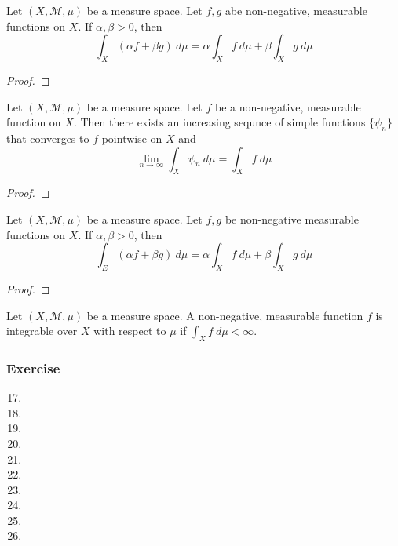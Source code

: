 \begin{theorem}
	Let $(X,\mathcal{M},\mu)$ be a measure space.
	Let $f,g$ abe non-negative, measurable functions on $X$.
	If $\alpha,\beta > 0$, then
	$$ \int_X (\alpha f + \beta g) \ d\mu = \alpha \int_X f \ d\mu + \beta\int_X g \ d\mu $$
\end{theorem}
\begin{proof}
\end{proof}

\begin{theorem}
	Let $(X,\mathcal{M},\mu)$ be a measure space.
	Let $f$ be a non-negative, measurable function on $X$.
	Then there exists an increasing sequnce of simple functions $\{ \psi_n \}$ that converges to $f$ pointwise on $X$ and
	$$ \lim_{n \to \infty} \int_X \psi_n \ d\mu = \int_X f \ d\mu $$
\end{theorem}
\begin{proof}
\end{proof}

\begin{theorem}
	Let $(X,\mathcal{M},\mu)$ be  a measure space.
	Let $f,g$ be non-negative measurable functions on $X$.
	If $\alpha,\beta > 0$, then
	$$ \int_E (\alpha f + \beta g) \ d\mu = \alpha \int_X f \ d\mu + \beta \int_X g \ d\mu $$
\end{theorem}
\begin{proof}
\end{proof}

\begin{definition}[integrable]
	Let $(X,\mathcal{M},\mu)$ be a measure space.
	A non-negative, measurable function $f$ is integrable over $X$ with respect to $\mu$ if $\displaystyle \int_X f \ d\mu < \infty$.
\end{definition}

\subsubsection{Exercise}
\begin{enumerate}
	\setcounter{enumi}{16}
	\item
	\item
	\item
	\item
	\item
	\item
	\item
	\item
	\item
	\item
\end{enumerate}

